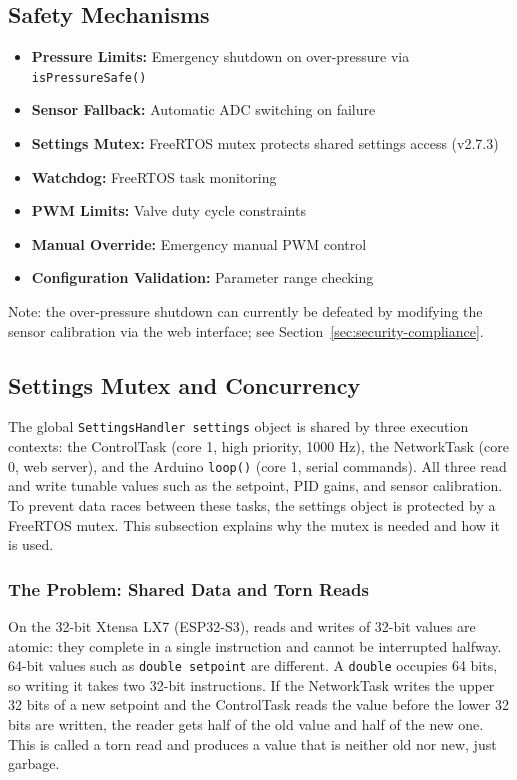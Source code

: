 \subsection{Safety Mechanisms}
\begin{itemize}
    \item \textbf{Pressure Limits:} Emergency shutdown on over-pressure via \texttt{isPressureSafe()}
    \item \textbf{Sensor Fallback:} Automatic ADC switching on failure
    \item \textbf{Settings Mutex:} FreeRTOS mutex protects shared settings access (v2.7.3)
    \item \textbf{Watchdog:} FreeRTOS task monitoring
    \item \textbf{PWM Limits:} Valve duty cycle constraints
    \item \textbf{Manual Override:} Emergency manual PWM control
    \item \textbf{Configuration Validation:} Parameter range checking
\end{itemize}

Note: the over-pressure shutdown can currently be defeated by modifying the sensor calibration via the web interface; see Section~\ref{sec:security-compliance}.

\subsection{Settings Mutex and Concurrency}
\label{sec:settings-mutex}

The global \texttt{SettingsHandler settings} object is shared by three execution
contexts: the ControlTask (core 1, high priority, 1000 Hz), the NetworkTask (core 0,
web server), and the Arduino \texttt{loop()} (core 1, serial commands). All three read
and write tunable values such as the setpoint, PID gains, and sensor calibration. To
prevent data races between these tasks, the settings object is protected by a FreeRTOS
mutex. This subsection explains why the mutex is needed and how it is used.

\subsubsection{The Problem: Shared Data and Torn Reads}

On the 32-bit Xtensa LX7 (ESP32-S3), reads and writes of 32-bit values are atomic: they
complete in a single instruction and cannot be interrupted halfway. 64-bit values such
as \texttt{double setpoint} are different. A \texttt{double} occupies 64 bits, so writing
it takes two 32-bit instructions. If the NetworkTask writes the upper 32 bits of a new
setpoint and the ControlTask reads the value before the lower 32 bits are written, the
reader gets half of the old value and half of the new one. This is called a torn read
and produces a value that is neither old nor new, just garbage.

